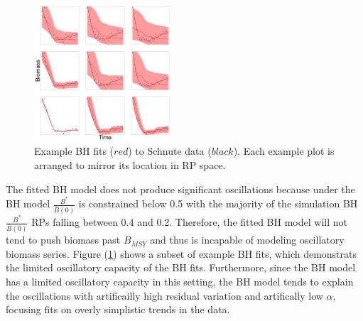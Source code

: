 %
\clearpage

%
\begin{figure}
\centering
\includegraphics[width=0.45\textwidth]{../ddBias/indexGridExpT45N300A0-1AS10K0.1.png}
\vspace{-0.45cm}
\caption{Example BH fits ($red$) to Schnute data ($black$). Each example plot is arranged to mirror its location in RP space.
}\label{bhGrid}
\end{figure}

%
The fitted BH model does not produce significant oscillations because
under the BH model $\frac{B^*}{\bar B(0)}$ is constrained below 0.5 with the
majority of the simulation BH $\frac{B^*}{\bar B(0)}$ RPs falling between 0.4 and 0.2. %
Therefore, the fitted BH model will not tend to push biomass past $B_{MSY}$ and
thus is incapable of modeling oscillatory biomass series. Figure (\ref{bhGrid})
shows a subset of example BH fits, which demonstrats the limited oscillatory
capacity of the BH fits. Furthermore, since the BH model has a limited
oscillatory capacity in this setting, the BH model tends to explain the
oscillations with artificailly high residual variation and artifically low
$\alpha$, focusing fits on overly simplistic trends in the data.



